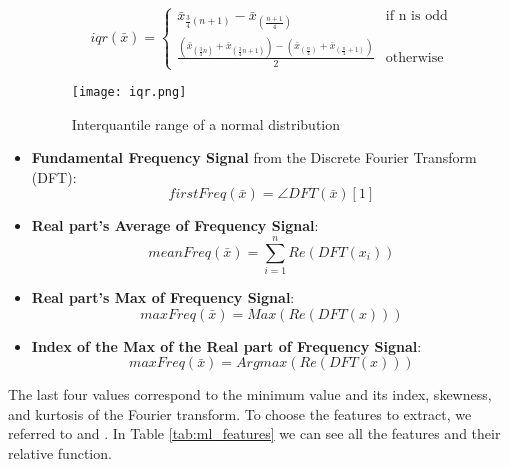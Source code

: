\begin{itemize}
        \begin{equation}
            iqr(\bar{x}) =  
                \begin{cases} 
                \bar{x}_{\frac{3}{4}(n+1)} - \bar{x}_{(\frac{n+1}{4})} & \text{if n is odd} \\
                \frac{(\bar{x}_{(\frac{3}{4}n)} + \bar{x}_{(\frac{3}{4}n+1)}) - (\bar{x}_{(\frac{n}{4})} + \bar{x}_{(\frac{n}{4}+1)})}{2} & \text{otherwise}
                \end{cases}
        \end{equation}
        \begin{figure}[H]
            \centering
            \texttt{[image: iqr.png]}
            \caption{Interquantile range of a normal distribution}
            \label{fig:iqr}
        \end{figure}
    \item \textbf{Fundamental Frequency Signal} from the Discrete Fourier Transform (DFT):
    \begin{equation}
        firstFreq(\bar{x}) = \angle DFT(\bar{x})[1]
    \end{equation}
    \item \textbf{Real part's Average of Frequency Signal}:
    \begin{equation}
        meanFreq(\bar{x}) = \sum_{i=1}^{n} Re(DFT(x_i))
    \end{equation}
    \item \textbf{Real part's Max of Frequency Signal}:
    \begin{equation}
        maxFreq(\bar{x}) = Max(Re(DFT(x)))
    \end{equation}
    \item \textbf{Index of the Max of the Real part of Frequency Signal}:
    \begin{equation}
        maxFreq(\bar{x}) = Argmax(Re(DFT(x)))
    \end{equation}
\end{itemize}
The last four values correspond to the minimum value and its index, skewness, and kurtosis of the Fourier transform.
To choose the features to extract, we referred to \cite{oneto:2020} and \cite{sama:2010}.
In Table \ref{tab:ml_features} we can see all the features and their relative function.

